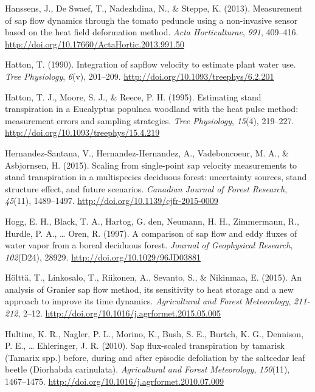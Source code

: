 \documentclass[11pt,twoside]{reedthesis}
\begin{document}
\hypertarget{ref-Hanssens2013}{}
Hanssens, J., De Swaef, T., Nadezhdina, N., \& Steppe, K. (2013).
Measurement of sap flow dynamics through the tomato peduncle using a
non-invasive sensor based on the heat field deformation method.
\emph{Acta Horticulturae}, \emph{991}, 409--416.
\url{http://doi.org/10.17660/ActaHortic.2013.991.50}

\hypertarget{ref-Hatton1990}{}
Hatton, T. (1990). Integration of sapflow velocity to estimate plant
water use. \emph{Tree Physiology}, \emph{6}(v), 201--209.
\url{http://doi.org/10.1093/treephys/6.2.201}

\hypertarget{ref-Hatton1995}{}
Hatton, T. J., Moore, S. J., \& Reece, P. H. (1995). Estimating stand
transpiration in a Eucalyptus populnea woodland with the heat pulse
method: measurement errors and sampling strategies. \emph{Tree
Physiology}, \emph{15}(4), 219--227.
\url{http://doi.org/10.1093/treephys/15.4.219}

\hypertarget{ref-Hernandez-Santana2015}{}
Hernandez-Santana, V., Hernandez-Hernandez, A., Vadeboncoeur, M. A., \&
Asbjornsen, H. (2015). Scaling from single-point sap velocity
measurements to stand transpiration in a multispecies deciduous forest:
uncertainty sources, stand structure effect, and future scenarios.
\emph{Canadian Journal of Forest Research}, \emph{45}(11), 1489--1497.
\url{http://doi.org/10.1139/cjfr-2015-0009}

\hypertarget{ref-Hogg1997}{}
Hogg, E. H., Black, T. A., Hartog, G. den, Neumann, H. H., Zimmermann,
R., Hurdle, P. A., \ldots{} Oren, R. (1997). A comparison of sap flow
and eddy fluxes of water vapor from a boreal deciduous forest.
\emph{Journal of Geophysical Research}, \emph{102}(D24), 28929.
\url{http://doi.org/10.1029/96JD03881}

\hypertarget{ref-Holtta2015}{}
Hölttä, T., Linkosalo, T., Riikonen, A., Sevanto, S., \& Nikinmaa, E.
(2015). An analysis of Granier sap flow method, its sensitivity to heat
storage and a new approach to improve its time dynamics.
\emph{Agricultural and Forest Meteorology}, \emph{211-212}, 2--12.
\url{http://doi.org/10.1016/j.agrformet.2015.05.005}

\hypertarget{ref-Hultine2010}{}
Hultine, K. R., Nagler, P. L., Morino, K., Bush, S. E., Burtch, K. G.,
Dennison, P. E., \ldots{} Ehleringer, J. R. (2010). Sap flux-scaled
transpiration by tamarisk (Tamarix spp.) before, during and after
episodic defoliation by the saltcedar leaf beetle (Diorhabda
carinulata). \emph{Agricultural and Forest Meteorology}, \emph{150}(11),
1467--1475. \url{http://doi.org/10.1016/j.agrformet.2010.07.009}
\end{document}
